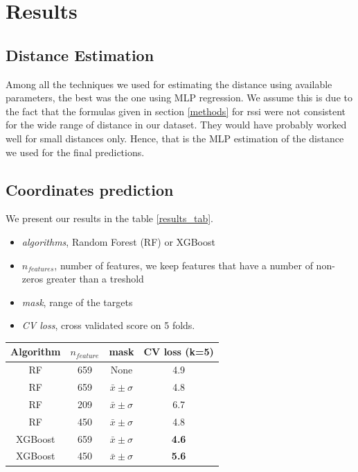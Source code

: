 \documentclass[twocolumn,2pt]{article}
\begin{document}
	
	\section{Results}
	\label{results}
	
	\subsection*{Distance Estimation}
	Among all the techniques we used for estimating the distance using available parameters, the best was the one using MLP regression. We assume this is due to the fact that the formulas given in section \ref{methods} for rssi were not consistent for the wide range of distance in our dataset. They would have probably worked well for small distances only. Hence, that is the MLP estimation of the distance we used for the final predictions.
	
	\subsection{Coordinates prediction}
	
	
	We present our results in the table \ref{results_tab}.
	\begin{itemize}
		\item \textit{algorithms}, Random Forest (RF) or XGBoost
		\item \textit{$n_{features}$}, number of features, we keep features that have a number of non-zeros greater than a treshold
		\item \textit{mask}, range of the targets
		\item \textit{CV loss}, cross validated score on 5 folds.
	\end{itemize}
	
	\begin{tabular}{c | c | c | c}
		\label{results_tab}
		Algorithm & $n_{feature}$ &mask & CV loss (k=5) \\
		\hline
		RF & 659 & None & 4.9 \\
		RF &659 & $\bar{x} \pm \sigma$ & 4.8 \\
		RF & 209 & $\bar{x} \pm  \sigma$ &  6.7 \\
		RF & 450 & $\bar{x} \pm  \sigma$ & 4.8 \\
		XGBoost & 659 & $\bar{x} \pm  \sigma$ & \textbf{4.6} \\
		XGBoost & 450 & $\bar{x} \pm  \sigma$ & \textbf{5.6} \\
		\hline		
	\end{tabular}
	\newline
\end{document}
